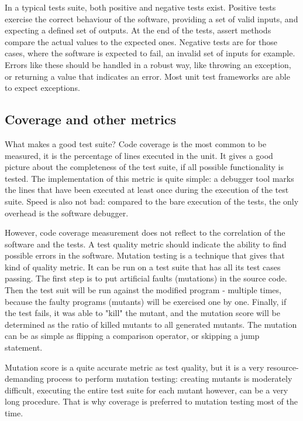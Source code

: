 In a typical tests suite, both positive and negative tests exist. Positive tests exercise the correct behaviour of the software, providing a set of valid inputs, and expecting a defined set of outputs. At the end of the tests, assert methods compare the actual values to the expected ones. Negative tests are for those cases, where the software is expected to fail, an invalid set of inputs for example. Errors like these should be handled in a robust way, like throwing an exception, or returning a value that indicates an error. Most unit test frameworks are able to expect exceptions. \cite{Olan:2003:UTT:948785.948830}

\subsection{Coverage and other metrics}
What makes a good test suite? Code coverage is the most common to be measured, it is the percentage of lines executed in the unit. It gives a good picture about the completeness of the test suite, if all possible functionality is tested. The implementation of this metric is quite simple: a debugger tool marks the lines that have been executed at least once during the execution of the test suite. Speed is also not bad: compared to the bare execution of the tests, the only overhead is the software debugger.

However, code coverage measurement does not reflect to the correlation of the software and the tests. A test quality metric should indicate the ability to find possible errors in the software. Mutation testing is a technique that gives that kind of quality metric. It can be run on a test suite that has all its test cases passing. The first step is to put artificial faults (mutations) in the source code. Then the test suit will be run against the modified program - multiple times, because the faulty programs (mutants) will be exercised one by one. Finally, if the test fails, it was able to "kill" the mutant, and the mutation score will be determined as the ratio of killed mutants to all generated mutants. The mutation can be as simple as flipping a comparison operator, or skipping a jump statement. \cite{5487526, aron_mut}

Mutation score is a quite accurate metric as test quality, but it is a very resource-demanding process to perform mutation testing: creating mutants is moderately difficult, executing the entire test suite for each mutant however, can be a very long procedure. That is why coverage is preferred to mutation testing most of the time.


